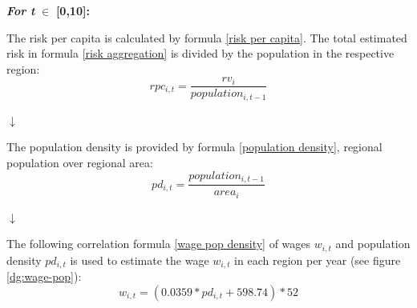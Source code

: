 \documentclass[10pt,a4paper]{article}
\begin{document}
\begin{center}
\textbf{\textit{For t }}$\in$ \textbf{[0,10]:}\vspace{.5cm}


The risk per capita is calculated by formula \ref{risk per capita}. The total estimated risk in formula \ref{risk aggregation} is divided by the population in the respective region:
\begin{equation}
    rpc_{i,t} = \frac{rv_{i}}{population_{i,t-1}}
    \label{risk per capita}
\end{equation}

\begin{center}
    $\downarrow$
\end{center}
The population density is provided by formula \ref{population density}, regional population over regional area:
\begin{equation}
    pd_{i,t} = \frac{population_{i,t-1}}{area_i}
    \label{population density}
\end{equation}

\begin{center}
    $\downarrow$
\end{center}
The following correlation formula \ref{wage pop density} of wages $w_{i,t}$ and population density $pd_{i,t}$ is used to estimate the wage $w_{i,t}$ in each region per year (see figure \ref{dg:wage-pop}):
\begin{equation}
    w_{i,t} = (0.0359*pd_{i,t}+598.74) * 52
    \label{wage pop density}
\end{equation}



\end{center}
\end{document}
